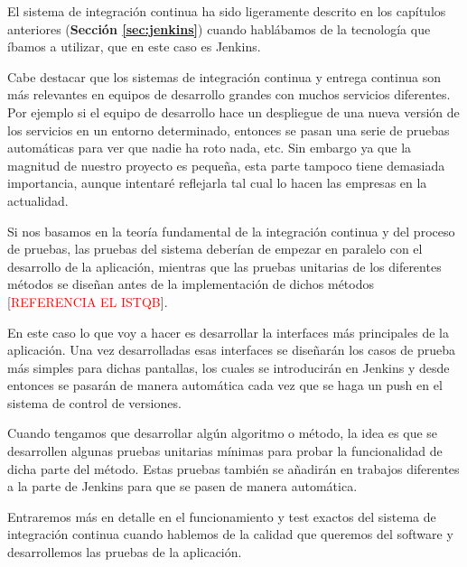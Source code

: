 El sistema de integración continua ha sido ligeramente descrito en los capítulos anteriores (\textbf{Sección \ref{sec:jenkins}}) cuando hablábamos de la tecnología que íbamos a utilizar, que en este caso es Jenkins. 

Cabe destacar que los sistemas de integración continua y entrega continua son más relevantes en equipos de desarrollo grandes con muchos servicios diferentes. Por ejemplo si el equipo de desarrollo hace un despliegue de una nueva versión de los servicios en un entorno determinado, entonces se pasan una serie de pruebas automáticas para ver que nadie ha roto nada, etc. Sin embargo ya que la magnitud de nuestro proyecto es pequeña, esta parte tampoco tiene demasiada importancia, aunque intentaré reflejarla tal cual lo hacen las empresas en la actualidad. 

Si nos basamos en la teoría fundamental de la integración continua y del proceso de pruebas, las pruebas del sistema deberían de empezar en paralelo con el desarrollo de la aplicación, mientras que las pruebas unitarias de los diferentes métodos se diseñan antes de la implementación de dichos métodos [\textcolor{red}{REFERENCIA EL ISTQB}]. 

En este caso lo que voy a hacer es desarrollar la interfaces más principales de la aplicación. Una vez desarrolladas esas interfaces se diseñarán los casos de prueba más simples para dichas pantallas, los cuales se introducirán en Jenkins y desde entonces se pasarán de manera automática cada vez que se haga un push en el sistema de control de versiones. 

Cuando tengamos que desarrollar algún algoritmo o método, la idea es que se desarrollen algunas pruebas unitarias mínimas para probar la funcionalidad de dicha parte del método. Estas pruebas también se añadirán en trabajos diferentes a la parte de Jenkins para que se pasen de manera automática.

Entraremos más en detalle en el funcionamiento y test exactos del sistema de integración continua cuando hablemos de la calidad que queremos del software y desarrollemos las pruebas de la aplicación. 


